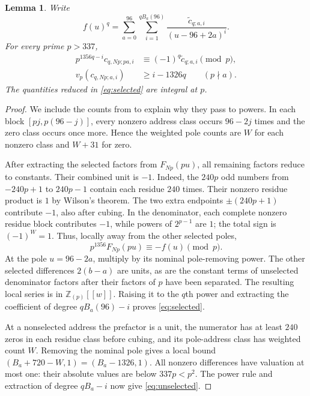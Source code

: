 \documentclass[11pt]{article}
\newtheorem{lemma}[theorem]{Lemma}
\theoremstyle{remark}
\newcommand{\Z}{\mathbb Z}
\numberwithin{equation}{section}
\begin{document}
\begin{lemma}\label{lem:dilate}
Write
\[
 f(u)^q=\sum_{a=0}^{96}\sum_{i=1}^{qB_a(96)}
             \frac{\widetilde c_{q;a,i}}{(u-96+2a)^i}.
\]
For every prime $p>337$,
\begin{align}
 p^{1356q-i}c_{q,Np;pa,i}
       &\equiv(-1)^q\widetilde c_{q;a,i}\pmod p,
                                                     \label{eq:selected}\\
 v_p(c_{q,Np;a,i})&\ge i-1326q\qquad(p\nmid a).
                                                     \label{eq:unselected}
\end{align}
The quantities reduced in \eqref{eq:selected} are integral at $p$.
\end{lemma}
\begin{proof}
We include the counts from \cite[Section~5]{fifteen} to explain
why they pass to powers. In each block $[pj,p(96-j)]$, every
nonzero address class occurs $96-2j$ times and the zero class
occurs once more. Hence the weighted pole counts are $W$ for
each nonzero class and $W+31$ for zero.

After extracting the selected factors from $F_{Np}(pu)$, all
remaining factors reduce to constants. Their combined unit is $-1$.
Indeed, the $240p$ odd numbers from $-240p+1$ to $240p-1$
contain each residue $240$ times. Their nonzero residue product
is $1$ by Wilson's theorem. The two extra endpoints
$\pm(240p+1)$ contribute $-1$, also after cubing.
In the denominator, each complete nonzero residue block contributes
$-1$, while powers of $2^{p-1}$ are $1$; the total sign is
$(-1)^W=1$. Thus, locally away from the other selected poles,
\begin{equation}\label{eq:functionreduction}
 p^{1356}F_{Np}(pu)\equiv-f(u)\pmod p.
\end{equation}
At the pole $u=96-2a$, multiply by its nominal pole-removing
power. The other selected differences $2(b-a)$ are units, as
are the constant terms of unselected denominator factors after
their factors of $p$ have been separated. The resulting local
series is in $\Z_{(p)}[[w]]$.
Raising it to the $q$th power and extracting the coefficient
of degree $qB_a(96)-i$ proves \eqref{eq:selected}.

At a nonselected address the prefactor is a unit, the numerator
has at least $240$ zeros in each residue class before cubing,
and its pole-address class has weighted count $W$. Removing
the nominal pole gives a local bound
$(B_a+720-W,1)=(B_a-1326,1)$.
All nonzero differences have valuation at most one: their
absolute values are below $337p<p^2$.
The power rule and extraction of degree $qB_a-i$ now give
\eqref{eq:unselected}.
\end{proof}
\end{document}
